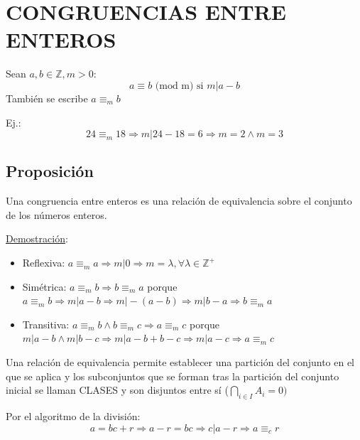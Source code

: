 \documentclass[10pt,a4paper,openright]{book}
\theoremstyle{break}
\begin{document}
\section*{CONGRUENCIAS ENTRE ENTEROS}
Sean $a,b\in \mathbb Z, m>0$:
$$a\equiv b\mbox{ (mod m) si }m|a-b$$
También se escribe $a\equiv_m b$\par
Ej.:
$$24\equiv_m 18\Rightarrow m|24-18=6\Rightarrow m=2 \wedge m=3$$
\subsection{Proposición}
Una congruencia entre enteros es una relación de equivalencia sobre el conjunto de los números enteros.\par
\underline{Demostración}:
\begin{itemize}
\item Reflexiva: $a\equiv_m a\Rightarrow m|0\Rightarrow m=\lambda, \forall \lambda \in \mathbb Z^+$
\item Simétrica: $a\equiv_m b \Rightarrow b\equiv_m a$ porque $a\equiv_m b \Rightarrow m|a-b \Rightarrow m|-(a-b) \Rightarrow m|b-a \Rightarrow b\equiv_m a$
\item Transitiva: $a\equiv_m b \wedge b\equiv_m c \Rightarrow a\equiv_m c$ porque $m|a-b \wedge m|b-c\Rightarrow m|a-b+b-c\Rightarrow m|a-c \Rightarrow a\equiv_m c$
\end{itemize}
Una relación de equivalencia permite establecer una partición del conjunto en el que se aplica y los subconjuntos que se forman tras la partición del conjunto inicial se llaman CLASES y son disjuntos entre sí ($\bigcap_{i\in I} A_i=0)$\par
Por el algoritmo de la división:
$$a=bc+r\Rightarrow a-r=bc\Rightarrow c|a-r\Rightarrow a\equiv_c r$$
\end{document}
